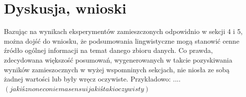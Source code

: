 \documentclass{classrep}
\begin{document}

% 
% 
% 

\section{Dyskusja, wnioski}

Bazując na wynikach eksperymentów zamieszczonych odpowidnio w sekcji 4 i 5, można dojść do wniosku, że podsumowania lingwistyczne
mogą stanowić cenne źródło ogólnej informacji na temat danego zbioru danych. Co prawda, zdecydowana większość posumowań, wygenerowanych w takcie pozyskiwania wyników zamieszocznych w wyżej 
wspomninych sekcjach, nie niosła ze sobą żadnej wartości lub były wręcz oczywiste. Przykładowo: .... $(jakiś z none co nie ma sensu i jakiś taki oczywisty)$





% 
% 
% 
\end{document}
